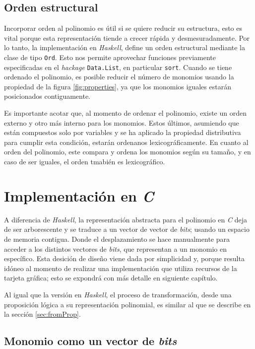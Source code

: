 \subsection{Orden estructural}

Incorporar orden al polinomio es útil si se quiere reducir su estructura, esto es vital porque esta representación tiende a crecer rápida y desmesuradamente. Por lo tanto, la implementación en \textit{Haskell}, define un orden estructural mediante la clase de tipo \texttt{Ord}. Esto nos permite aprovechar funciones previamente especificadas en el \textit{hackage} \texttt{Data.List}, en particular \texttt{sort}. Cuando se tiene ordenado el polinomio, es posible reducir el número de monomios usando la propiedad de la figura \ref{fig:properties}, ya que los monomios iguales estarán posicionados contiguamente.

Es importante acotar que, al momento de ordenar el polinomio, existe un orden externo y otro más interno para los monomios. Estos últimos, asumiendo que están compuestos solo por variables y se ha aplicado la propiedad distributiva para cumplir esta condición, estarán ordenanos lexicográficamente. En cuanto al orden del polinomio, este compara y ordena los monomios según su tamaño, y en caso de ser iguales, el orden tmabién es lexicográfico.

\section{Implementación en \textit{C}}

A diferencia de \textit{Haskell}, la representación abstracta para el polinomio en \textit{C} deja de ser arborescente y se traduce a un vector de vector de \textit{bits}; usando un espacio de memoria contigua. Donde el desplazamiento se hace manualmente para acceder a los distintos vectores de \textit{bits}, que representan a un monomio en específico. Esta desición de diseño viene dada por simplicidad y, porque resulta idóneo al momento de realizar una implementación que utiliza recursos de la tarjeta gráfica; esto se expondrá con más detalle en siguiente capítulo.

Al igual que la versión en \textit{Haskell}, el proceso de transformación, desde una proposición lógica a su representación polinomial, es similar al que se describe en la sección \ref{sec:fromProp}.

\subsection{Monomio como un vector de \textit{bits}}

